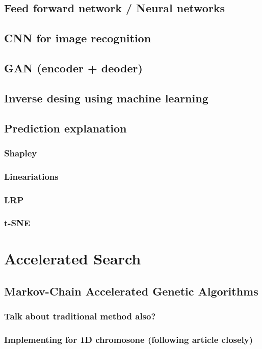 \section{Feed forward network / Neural networks}
\section{CNN for image recognition}
\section{GAN (encoder + deoder)}
\section{Inverse desing using machine learning}
\section{Prediction explanation}
\subsection{Shapley}
\subsection{Lineariations}
\subsection{LRP}
\subsection{t-SNE}

\chapter{Accelerated Search}
\section{Markov-Chain Accelerated Genetic Algorithms}

\subsection{Talk about traditional method also?}

\subsection{Implementing for 1D chromosone (following article closely)}

